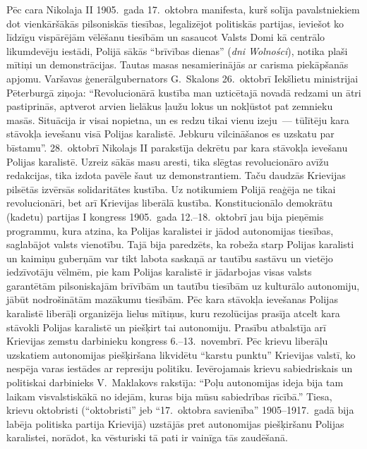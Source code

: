 \documentclass[twoside,a5paper,12pt,fleqn,openany]{extbook}
\newcommand{\pltxti}[1]{\textit{\textpolish{#1}}}
\begin{document}
Pēc cara Nikolaja II 1905.~gada 17.~oktobra manifesta, kurš solīja pavalstniekiem dot vienkāršākās pilsoniskās tiesības, legalizējot politiskās partijas, ieviešot ko līdzīgu vispārējām vēlēšanu tiesībām un sasaucot Valsts Domi kā centrālo likumdevēju iestādi, Polijā sākās ``brīvības dienas'' (\pltxti{dni Wolności}), notika plaši mītiņi un demonstrācijas. Tautas masas nesamierinājās ar carisma piekāpšanās apjomu. Varšavas ģenerālgubernators G.~Skalons 26.~oktobrī Iekšlietu ministrijai Pēterburgā ziņoja: ``Revolucionārā kustība man uzticētajā novadā redzami un ātri pastiprinās, aptverot arvien lielākus ļaužu lokus un nokļūstot pat zemnieku masās. Situācija ir visai nopietna, un es redzu tikai vienu izeju~--- tūlītēju kara stāvokļa ievešanu visā Polijas karalistē. Jebkuru vilcināšanos es uzskatu par bīstamu''. 28.~oktobrī Nikolajs II parakstīja dekrētu par kara stāvokļa ievešanu Polijas karalistē. Uzreiz sākās masu aresti, tika slēgtas revolucionāro avīžu redakcijas, tika izdota pavēle šaut uz demonstrantiem. Taču daudzās Krievijas pilsētās izvērsās solidaritātes kustība. Uz notikumiem Polijā reaģēja ne tikai revolucionāri, bet arī Krievijas liberālā kustība. Konstitucionālo demokrātu (kadetu) partijas I kongress 1905.~gada 12.--18.~oktobrī jau bija pieņēmis programmu, kura atzina, ka Polijas karalistei ir jādod autonomijas tiesības, saglabājot valsts vienotību. Tajā bija paredzēts, ka robeža starp Polijas karalisti un kaimiņu guberņām var tikt labota saskaņā ar tautību sastāvu un vietējo iedzīvotāju vēlmēm, pie kam Polijas karalistē ir jādarbojas visas valsts garantētām pilsoniskajām brīvībām un tautību tiesībām uz kulturālo autonomiju, jābūt nodrošinātām mazākumu tiesībām. Pēc kara stāvokļa ievešanas Polijas karalistē liberāļi organizēja lielus mītiņus, kuru rezolūcijas prasīja atcelt kara stāvokli Polijas karalistē un piešķirt tai autonomiju. Prasību atbalstīja arī Krievijas zemstu darbinieku kongress 6.--13.~novembrī. Pēc krievu liberāļu uzskatiem autonomijas piešķiršana likvidētu ``karstu punktu'' Krievijas valstī, ko nespēja varas iestādes ar represiju politiku. Ievērojamais krievu sabiedriskais un politiskai darbinieks V.~Maklakovs rakstīja: ``Poļu autonomijas ideja bija tam laikam visvalstiskākā no idejām, kuras bija mūsu sabiedrības rīcībā.'' Tiesa, krievu oktobristi (``oktobristi'' jeb ``17.~oktobra savienība'' 1905--1917.~gadā bija labēja politiska partija Krievijā) uzstājās pret autonomijas piešķiršanu Polijas karalistei, norādot, ka vēsturiski tā pati ir vainīga tās zaudēšanā.
\end{document}
